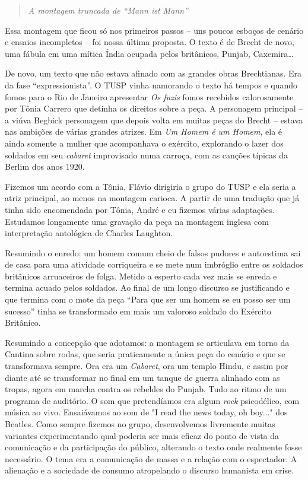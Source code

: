 \begin{quote}
\textit{A montagem truncada de “Mann ist Mann”}
\end{quote}

Essa montagem que ficou só nos primeiros passos -- uns poucos esboços de
cenário e ensaios incompletos -- foi nossa última proposta. O texto é de
Brecht de novo, uma fábula em uma mítica Índia ocupada pelos britânicos,
Punjab, Caxemira\ldots{}

De novo, um texto que não estava afinado com as grandes obras
Brechtianas. Era da fase “expressionista”. O TUSP vinha namorando o
texto há tempos e quando fomos para o Rio de Janeiro apresentar \textit{Os
fuzis} fomos recebidos calorosamente por Tônia Carrero que detinha os
direitos sobre a peça. A personagem principal -- a viúva Begbick
personagem que depois volta em muitas peças do Brecht -- estava nas
ambições de várias grandes atrizes. Em \textit{Um Homem é um Homem}, ela é
ainda somente a mulher que acompanhava o exército, explorando o lazer
dos soldados em seu \textit{cabaret} improvisado numa carroça, com as
canções típicas da Berlim dos anos 1920.

Fizemos um acordo com a Tônia, Flávio dirigiria o grupo do TUSP e ela
seria a atriz principal, ao menos na montagem carioca. A partir de uma
tradução que já tinha sido encomendada por Tônia, André e eu fizemos
várias adaptações. Estudamos longamente uma gravação da peça na montagem
inglesa com interpretação antológica de Charles Laughton.

Resumindo o enredo: um homem comum cheio de falsos pudores e autoestima
sai de casa para uma atividade corriqueira e se mete num imbróglio entre
os soldados britânicos arruaceiros de folga. Metido a esperto cada vez
mais se enreda e termina acuado pelos soldados. Ao final de um longo
discurso se justificando e que termina com o mote da peça “Para que ser
um homem se eu posso ser um sucesso” tinha se transformado em mais um
valoroso soldado do Exército Britânico.

Resumindo a concepção que adotamos: a montagem se articulava em torno da
Cantina sobre rodas, que seria praticamente a única peça do cenário e
que se transformava sempre. Ora era um \textit{Cabaret}, ora um templo
Hindu, e assim por diante até se transformar no final em um tanque de
guerra alinhado com as tropas, agora em marcha contra os rebeldes do
Punjab. Tudo ao ritmo de um programa de auditório. O som que
pretendíamos era algum \textit{rock} psicodélico, com música ao vivo.
Ensaiávamos ao som de "I read the news today, oh boy..." dos Beatles.
Como sempre fizemos no grupo, desenvolvemos livremente muitas variantes
experimentando qual poderia ser mais eficaz do ponto de vista da
comunicação e da participação do público, alterando o texto onde
realmente fosse necessário. O tema era a comunicação de massa e a
relação com o espectador. A alienação e a sociedade de consumo
atropelando o discurso humanista em crise.

